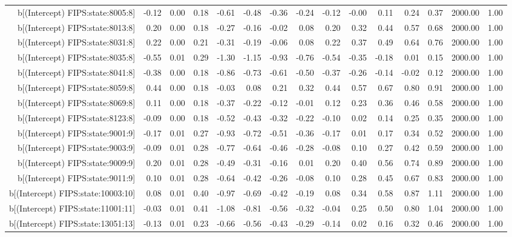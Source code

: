 \begin{table}[ht]
\begin{tabular}{rrrrrrrrrrrrrrr}
  b[(Intercept) FIPS:state:8005:8] & -0.12 & 0.00 & 0.18 & -0.61 & -0.48 & -0.36 & -0.24 & -0.12 & -0.00 & 0.11 & 0.24 & 0.37 & 2000.00 & 1.00 \\ 
  b[(Intercept) FIPS:state:8013:8] & 0.20 & 0.00 & 0.18 & -0.27 & -0.16 & -0.02 & 0.08 & 0.20 & 0.32 & 0.44 & 0.57 & 0.68 & 2000.00 & 1.00 \\ 
  b[(Intercept) FIPS:state:8031:8] & 0.22 & 0.00 & 0.21 & -0.31 & -0.19 & -0.06 & 0.08 & 0.22 & 0.37 & 0.49 & 0.64 & 0.76 & 2000.00 & 1.00 \\ 
  b[(Intercept) FIPS:state:8035:8] & -0.55 & 0.01 & 0.29 & -1.30 & -1.15 & -0.93 & -0.76 & -0.54 & -0.35 & -0.18 & 0.01 & 0.15 & 2000.00 & 1.00 \\ 
  b[(Intercept) FIPS:state:8041:8] & -0.38 & 0.00 & 0.18 & -0.86 & -0.73 & -0.61 & -0.50 & -0.37 & -0.26 & -0.14 & -0.02 & 0.12 & 2000.00 & 1.00 \\ 
  b[(Intercept) FIPS:state:8059:8] & 0.44 & 0.00 & 0.18 & -0.03 & 0.08 & 0.21 & 0.32 & 0.44 & 0.57 & 0.67 & 0.80 & 0.91 & 2000.00 & 1.00 \\ 
  b[(Intercept) FIPS:state:8069:8] & 0.11 & 0.00 & 0.18 & -0.37 & -0.22 & -0.12 & -0.01 & 0.12 & 0.23 & 0.36 & 0.46 & 0.58 & 2000.00 & 1.00 \\ 
  b[(Intercept) FIPS:state:8123:8] & -0.09 & 0.00 & 0.18 & -0.52 & -0.43 & -0.32 & -0.22 & -0.10 & 0.02 & 0.14 & 0.25 & 0.35 & 2000.00 & 1.00 \\ 
  b[(Intercept) FIPS:state:9001:9] & -0.17 & 0.01 & 0.27 & -0.93 & -0.72 & -0.51 & -0.36 & -0.17 & 0.01 & 0.17 & 0.34 & 0.52 & 2000.00 & 1.00 \\ 
  b[(Intercept) FIPS:state:9003:9] & -0.09 & 0.01 & 0.28 & -0.77 & -0.64 & -0.46 & -0.28 & -0.08 & 0.10 & 0.27 & 0.42 & 0.59 & 2000.00 & 1.00 \\ 
  b[(Intercept) FIPS:state:9009:9] & 0.20 & 0.01 & 0.28 & -0.49 & -0.31 & -0.16 & 0.01 & 0.20 & 0.40 & 0.56 & 0.74 & 0.89 & 2000.00 & 1.00 \\ 
  b[(Intercept) FIPS:state:9011:9] & 0.10 & 0.01 & 0.28 & -0.64 & -0.42 & -0.26 & -0.08 & 0.10 & 0.28 & 0.45 & 0.67 & 0.83 & 2000.00 & 1.00 \\ 
  b[(Intercept) FIPS:state:10003:10] & 0.08 & 0.01 & 0.40 & -0.97 & -0.69 & -0.42 & -0.19 & 0.08 & 0.34 & 0.58 & 0.87 & 1.11 & 2000.00 & 1.00 \\ 
  b[(Intercept) FIPS:state:11001:11] & -0.03 & 0.01 & 0.41 & -1.08 & -0.81 & -0.56 & -0.32 & -0.04 & 0.25 & 0.50 & 0.80 & 1.04 & 2000.00 & 1.00 \\ 
  b[(Intercept) FIPS:state:13051:13] & -0.13 & 0.01 & 0.23 & -0.66 & -0.56 & -0.43 & -0.29 & -0.14 & 0.02 & 0.16 & 0.32 & 0.46 & 2000.00 & 1.00 \\ 

\end{tabular}
\end{table}
